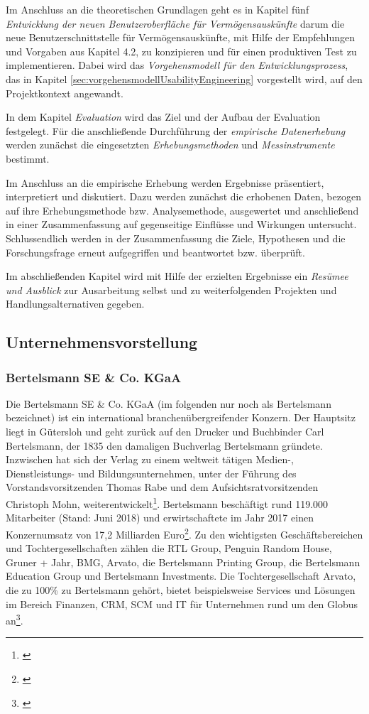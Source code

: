 Im Anschluss an die theoretischen Grundlagen geht es in Kapitel fünf \textit{Entwicklung der neuen Benutzeroberfläche für Vermögensauskünfte} darum die neue Benutzerschnittstelle für Vermögensauskünfte, mit Hilfe der Empfehlungen und Vorgaben aus Kapitel 4.2, zu konzipieren und für einen produktiven Test zu implementieren. Dabei wird das \textit{Vorgehensmodell für den Entwicklungsprozess}, das in Kapitel \ref{sec:vorgehensmodellUsabilityEngineering} vorgestellt wird, auf den Projektkontext angewandt.

In dem Kapitel \textit{Evaluation} wird das Ziel und der Aufbau der Evaluation festgelegt. Für die anschließende Durchführung der \textit{empirische Datenerhebung} werden zunächst die eingesetzten \textit{Erhebungsmethoden} und \textit{Messinstrumente} bestimmt.

Im Anschluss an die empirische Erhebung werden Ergebnisse präsentiert, interpretiert und diskutiert. Dazu werden zunächst die erhobenen Daten, bezogen auf ihre Erhebungsmethode bzw. Analysemethode, ausgewertet und anschließend in einer Zusammenfassung auf gegenseitige Einflüsse und Wirkungen untersucht. Schlussendlich werden in der Zusammenfassung die Ziele, Hypothesen und die Forschungsfrage erneut aufgegriffen und beantwortet bzw. überprüft.

Im abschließenden Kapitel wird mit Hilfe der erzielten Ergebnisse ein \textit{Resümee und Ausblick} zur Ausarbeitung selbst und zu weiterfolgenden Projekten und Handlungsalternativen gegeben.



\subsection{Unternehmensvorstellung}
\subsubsection{Bertelsmann SE \& Co. KGaA} Die Bertelsmann SE \& Co. KGaA (im folgenden nur noch als Bertelsmann bezeichnet) ist ein international branchenübergreifender Konzern. Der Hauptsitz liegt in Gütersloh und geht zurück auf den Drucker und Buchbinder Carl Bertelsmann, der 1835 den damaligen Buchverlag Bertelsmann gründete. Inzwischen hat sich der Verlag zu einem weltweit tätigen Medien-, Dienstleistungs- und Bildungsunternehmen, unter der Führung des Vorstandsvorsitzenden Thomas Rabe und dem Aufsichtsratvorsitzenden Christoph Mohn, weiterentwickelt\footnote{\cite{BertelsmannGeschaeftsbericht2016}}. Bertelsmann beschäftigt rund 119.000 Mitarbeiter (Stand: Juni 2018) und erwirtschaftete im Jahr 2017 einen Konzernumsatz von 17,2 Milliarden Euro\footnote{\cite{BertelsmannAufEinenBlick2018}}. Zu den wichtigsten Geschäftsbereichen und Tochtergesellschaften zählen die RTL Group, Penguin Random House, Gruner + Jahr, BMG, Arvato, die Bertelsmann Printing Group, die Bertelsmann Education Group und Bertelsmann Investments. Die Tochtergesellschaft Arvato, die zu 100\% zu Bertelsmann gehört, bietet beispielsweise Services und Lösungen im Bereich Finanzen, \gls{CRM}, \gls{SCM} und IT für Unternehmen rund um den Globus an\footnote{\cite{BertelsmannGeschaeftsbericht2016}}.

